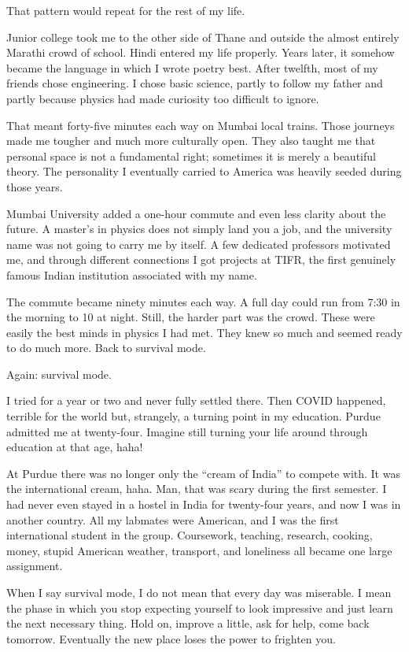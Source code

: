 \documentclass[11pt,twoside,openany]{book}
\newcommand{\scene}{\par\vspace{0.7em}{\centering\color{accent}\rule{0.85cm}{0.6pt}\par}\vspace{0.5em}\noindent\ignorespaces}
\begin{document}
That pattern would repeat for the rest of my life.

Junior college took me to the other side of Thane and outside the almost
entirely Marathi crowd of school. Hindi entered my life properly. Years later,
it somehow became the language in which I wrote poetry best. After twelfth,
most of my friends chose engineering. I chose basic science, partly to follow
my father and partly because physics had made curiosity too difficult to
ignore.

That meant forty-five minutes each way on Mumbai local trains. Those journeys
made me tougher and much more culturally open. They also taught me that
personal space is not a fundamental right; sometimes it is merely a beautiful
theory. The personality I eventually carried to America was heavily seeded
during those years.

Mumbai University added a one-hour commute and even less clarity about the
future. A master's in physics does not simply land you a job, and the
university name was not going to carry me by itself. A few dedicated
professors motivated me, and through different connections I got projects at
TIFR, the first genuinely famous Indian institution associated with my name.

The commute became ninety minutes each way. A full day could run from 7:30 in
the morning to 10 at night. Still, the harder part was the crowd. These were
easily the best minds in physics I had met. They knew so much and seemed ready
to do much more. Back to survival mode.

Again: survival mode.

I tried for a year or two and never fully settled there. Then COVID happened,
terrible for the world but, strangely, a turning point in my education. Purdue
admitted me at twenty-four. Imagine still turning your life around through
education at that age, haha!

\scene

At Purdue there was no longer only the ``cream of India'' to compete with. It
was the international cream, haha. Man, that was scary during the first
semester. I had never even stayed in a hostel in India for twenty-four years,
and now I was in another country. All my labmates were American, and I was the
first international student in the group. Coursework, teaching, research,
cooking, money, stupid American weather, transport, and loneliness all became
one large assignment.

When I say survival mode, I do not mean that every day was miserable. I mean
the phase in which you stop expecting yourself to look impressive and just
learn the next necessary thing. Hold on, improve a little, ask for help, come
back tomorrow. Eventually the new place loses the power to frighten you.
\end{document}
